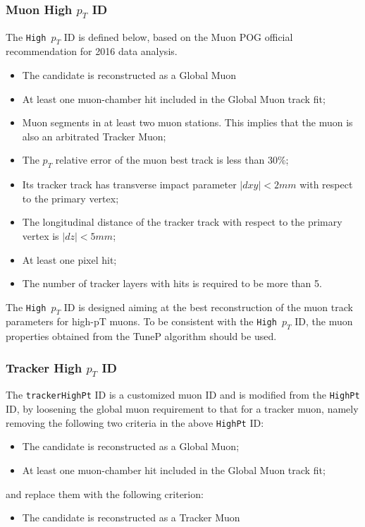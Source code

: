 \subsubsection{Muon High $p_T$ ID}
The \texttt{High $p_T$} ID is defined below, based on the Muon POG official recommendation for 2016 data analysis.
\begin{itemize}
\item  The candidate is reconstructed as a Global Muon 
\item  At least one muon-chamber hit included in the Global Muon track fit;
\item  Muon segments in at least two muon stations. This implies that the muon is also an arbitrated Tracker Muon; 
\item  The $p_T$ relative error of the muon best track is less than 30\%;
\item  Its tracker track has transverse impact parameter $|dxy| < 2 mm$ with respect to the primary vertex;
\item  The longitudinal distance of the tracker track with respect to the primary vertex is $|dz| < 5 mm$;
\item  At least one pixel hit;
\item  The number of tracker layers with hits is required to be more than 5.
\end{itemize}

The \texttt{High $p_T$} ID is designed aiming at the best reconstruction of the muon track parameters for high-pT muons. To be consistent with the \texttt{High $p_T$} ID, the muon properties obtained from the TuneP algorithm should be used.

\subsubsection{Tracker High $p_T$ ID}
The \texttt{trackerHighPt} ID is a customized muon ID and is modified from the \texttt{HighPt} ID, by loosening the global muon requirement to that for a tracker muon, namely removing the following two criteria in the above \texttt{HighPt} ID:
\begin{itemize}
\item  The candidate is reconstructed as a Global Muon;
\item  At least one muon-chamber hit included in the Global Muon track fit;
\end{itemize}
and replace them with the following criterion:
\begin{itemize}
\item  The candidate is reconstructed as a Tracker Muon 
\end{itemize}

